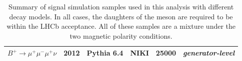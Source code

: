 \begin{table}[h!]
\begin{center}
\begin{tabular}{l l l l l l}
			$B^{+} \rightarrow \mu^{+} \mu^{-} \mu^{+} \nu$ & 2012 & Pythia 6.4\cite{pythia6} & NIKI & 25000 & \textit{generator-level}\\ %
%
			\bottomrule
		\end{tabular}
	\end{center}
	\caption{Summary of signal simulation samples used in this analysis with different decay models. In all cases, the daughters of the \Bpm meson are required to be within the \gls{LHCb} acceptance. All of these samples are a mixture under the two magnetic polarity conditions.}
	\label{tab:MCPPass}
\end{table}


